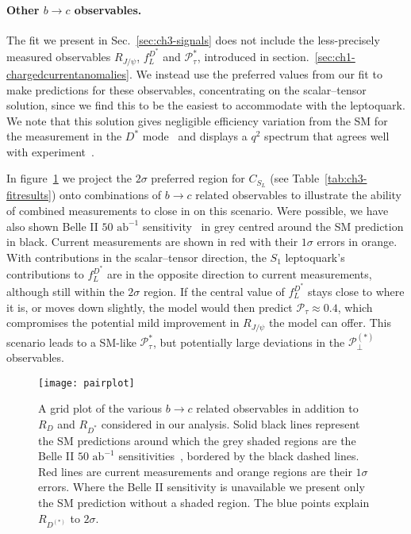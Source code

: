 \paragraph{Other $b \to c$ observables.} The fit we present in
Sec.~\ref{sec:ch3-signals} does not include the less-precisely measured
observables $R_{J/\psi}$, $f_L^{D^*}$ and $\mathcal{P}_\tau^*$, introduced in
section.~\ref{sec:ch1-chargedcurrentanomalies}. We instead use the preferred
values from our fit to make predictions for these observables, concentrating on
the scalar--tensor solution, since we find this to be the easiest to accommodate
with the leptoquark. We note that this solution gives negligible efficiency
variation from the SM for the measurement in the $D^*$ mode~\cite{Sato:2016svk}
and displays a $q^2$ spectrum that agrees well with
experiment~\cite{Freytsis:2015qca}.

In figure~\ref{fig:ch3-btocpredictions} we project the $2\sigma$ preferred
region for $C_{S_L}$ (see Table~\ref{tab:ch3-fitresults}) onto combinations of
$b \to c$ related observables to illustrate the ability of combined measurements
to close in on this scenario. Were possible, we have also shown Belle II
$50 \text{ ab}^{-1}$ sensitivity~\cite{Alonso:2017ktd} in grey centred around
the SM prediction in black. Current measurements are shown in red with their
$1 \sigma$ errors in orange. With contributions in the scalar--tensor direction,
the $S_{1}$ leptoquark's contributions to $f_L^{D^*}$ are in the opposite
direction to current measurements, although still within the $2\sigma$ region.
If the central value of $f_L^{D^*}$ stays close to where it is, or moves down
slightly, the model would then predict $\mathcal{P}_\tau \approx 0.4$, which
compromises the potential mild improvement in $R_{J/\psi}$ the model can offer.
This scenario leads to a SM-like $\mathcal{P}_{\tau}^*$, but potentially large
deviations in the $\mathcal{P}_{\perp}^{(*)}$ observables.

\begin{figure}[t]
  \centering
  \texttt{[image: pairplot]}
  \caption[A grid plot of the various $b \to c$ related observables in addition
  to $R_{D}$ and $R_{D^*}$ considered in our analysis.]{A grid plot of the
    various $b \to c$ related observables in addition to $R_{D}$ and $R_{D^*}$
    considered in our analysis. Solid black lines represent the SM predictions
    around which the grey shaded regions are the Belle II $50 \text{ ab}^{-1}$
    sensitivities~\cite{Alonso:2017ktd}, bordered by the black dashed lines. Red
    lines are current measurements and orange regions are their $1\sigma$
    errors. Where the Belle II sensitivity is unavailable we present only the SM
    prediction without a shaded region. The blue points explain $R_{D^{(*)}}$ to
    $2 \sigma$.}
  \label{fig:ch3-btocpredictions}
\end{figure}


